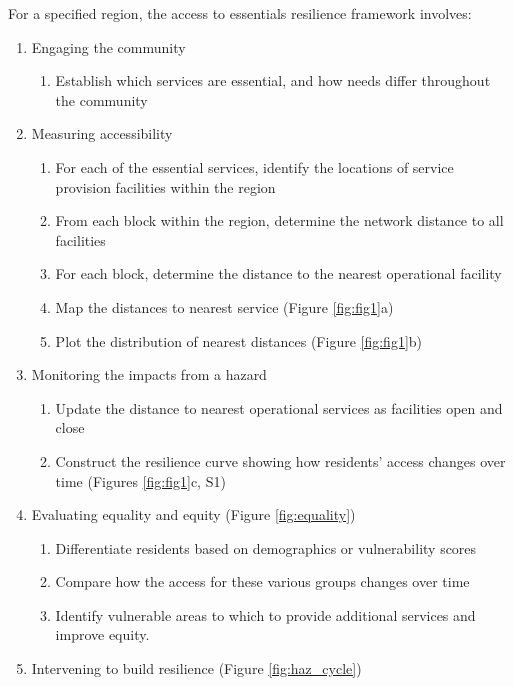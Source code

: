 \documentclass[9pt,twocolumn,twoside,lineno]{pnas-new}
\begin{document}
For a specified region, the access to essentials resilience framework involves: 
\begin{enumerate}[topsep=1pt,itemsep=0em,partopsep=1ex,parsep=1ex]
    \item Engaging the community 
    \begin{enumerate}[topsep=0pt,itemsep=-2pt,partopsep=1ex,parsep=1ex]
        \item Establish which services are essential, and how needs differ throughout the community
    \end{enumerate}
    \item Measuring accessibility
    \begin{enumerate}[topsep=0pt,itemsep=-2pt,partopsep=1ex,parsep=1ex]
        \item For each of the essential services, identify the locations of service provision facilities within the region
        \item From each block within the region, determine the network distance to all facilities
        \item For each block, determine the distance to the nearest operational facility
        \item Map the distances to nearest service (Figure \ref{fig:fig1}a)
        \item Plot the distribution of nearest distances (Figure \ref{fig:fig1}b)
    \end{enumerate}
    \item Monitoring the impacts from a hazard
    \begin{enumerate}[topsep=0pt,itemsep=-2pt,partopsep=1ex,parsep=1ex]
        \item Update the distance to nearest operational services as facilities open and close
        \item Construct the resilience curve showing how residents' access changes over time (Figures \ref{fig:fig1}c, S1)
    \end{enumerate}
    \item Evaluating equality and equity (Figure \ref{fig:equality})
    \begin{enumerate}[topsep=0pt,itemsep=-2pt,partopsep=1ex,parsep=1ex]
        \item Differentiate residents based on demographics or vulnerability scores
        \item Compare how the access for these various groups changes over time
        \item Identify vulnerable areas to which to provide additional services and improve equity.
    \end{enumerate}
    \item Intervening to build resilience (Figure \ref{fig:haz_cycle})
\end{enumerate}
\end{document}
